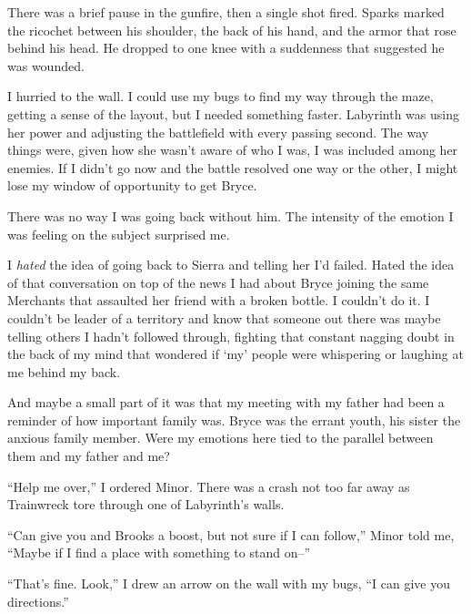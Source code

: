 There was a brief pause in the gunfire, then a single shot fired.  Sparks marked the ricochet between his shoulder, the back of his hand, and the armor that rose behind his head.  He dropped to one knee with a suddenness that suggested he was wounded.



I hurried to the wall.  I could use my bugs to find my way through the maze, getting a sense of the layout, but I needed something faster.  Labyrinth was using her power and adjusting the battlefield with every passing second.  The way things were, given how she wasn't aware of who I was, I was included among her enemies.  If I didn't go now and the battle resolved one way or the other, I might lose my window of opportunity to get Bryce.



There was no way I was going back without him.  The intensity of the emotion I was feeling on the subject surprised me.



I \emph{hated} the idea of going back to Sierra and telling her I'd failed.  Hated the idea of that conversation on top of the news I had about Bryce joining the same Merchants that assaulted her friend with a broken bottle.  I couldn't do it.  I couldn't be leader of a territory and know that someone out there was maybe telling others I hadn't followed through, fighting that constant nagging doubt in the back of my mind that wondered if `my' people were whispering or laughing at me behind my back.



And maybe a small part of it was that my meeting with my father had been a reminder of how important family was.  Bryce was the errant youth, his sister the anxious family member.  Were my emotions here tied to the parallel between them and my father and me?



``Help me over,'' I ordered Minor.  There was a crash not too far away as Trainwreck tore through one of Labyrinth's walls.



``Can give you and Brooks a boost, but not sure if I can follow,'' Minor told me, ``Maybe if I find a place with something to stand on--''



``That's fine.  Look,''  I drew an arrow on the wall with my bugs, ``I can give you directions.''



